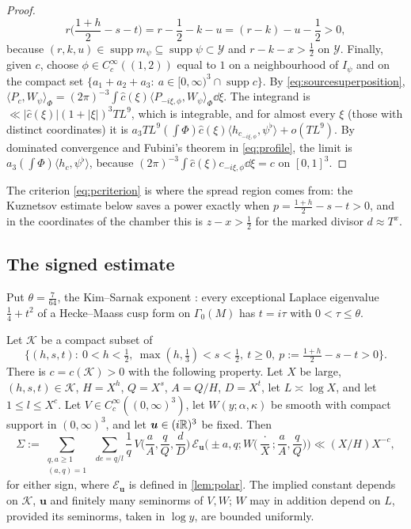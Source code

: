 \documentclass[11pt,colorlinks]{charlie}
\newcommand{\ip}[2]{\langle #1,#2\rangle}
\begin{document}
\begin{proof}
\begin{equation}\label{eq:pcriterion}
 r\Big(\frac{1+h}2-s-t\Big)=r-\frac12-k-u=(r-k)-u-\frac12>0,
\end{equation}
because $(r,k,u)\in\operatorname{supp}m_\psi\subseteq\operatorname{supp}\psi\subset\mathcal Y$ and $r-k-x>\frac12$ on $\mathcal Y$. Finally, given $c$, choose $\phi\in C_c^\infty((1,2))$ equal to $1$ on a neighbourhood of $I_\psi$ and on the compact set $\{a_1+a_2+a_3:\ a\in[0,\infty)^3\cap\operatorname{supp}c\}$. By \eqref{eq:sourcesuperposition}, $\ip{P_c}{W_\psi}_\Phi=(2\pi)^{-3}\int\widehat c(\xi)\ip{P_{-i\xi,\phi}}{W_\psi}_\Phi\dd\xi$. The integrand is $\ll|\widehat c(\xi)|(1+|\xi|)^3TL^9$, which is integrable, and for almost every $\xi$ (those with distinct coordinates) it is $a_3TL^9(\int\Phi)\widehat c(\xi)\ip{h_{c_{-i\xi,\phi}}}{\psi^\flat}+o(TL^9)$. By dominated convergence and Fubini's theorem in \eqref{eq:profile}, the limit is $a_3(\int\Phi)\ip{h_c}{\psi^\flat}$, because $(2\pi)^{-3}\int\widehat c(\xi)c_{-i\xi,\phi}\dd\xi=c$ on $[0,1]^3$.
\end{proof}

\begin{remark}
The criterion \eqref{eq:pcriterion} is where the spread region comes from: the Kuznetsov estimate below saves a power exactly when $p=\frac{1+h}2-s-t>0$, and in the coordinates of the chamber this is $z-x>\frac12$ for the marked divisor $d\approx T^x$.
\end{remark}

\subsection{The signed estimate}
Put $\theta=\frac7{64}$, the Kim--Sarnak exponent \cite{KimSarnak}: every exceptional Laplace eigenvalue $\frac14+t^2$ of a Hecke--Maass cusp form on $\Gamma_0(M)$ has $t=i\tau$ with $0<\tau\le\theta$.

\begin{theorem}\label{thm:signed}
Let $\mathcal K$ be a compact subset of
\[
 \Big\{(h,s,t):\ 0<h<\tfrac12,\ \max(h,\tfrac13)<s<\tfrac12,\ t\ge0,\ p:=\tfrac{1+h}2-s-t>0\Big\}.
\]
There is $c=c(\mathcal K)>0$ with the following property. Let $X$ be large, $(h,s,t)\in\mathcal K$, $H=X^h$, $Q=X^s$, $A=Q/H$, $D=X^t$, let $L\asymp\log X$, and let $1\le l\le X^{c}$. Let $V\in C_c^\infty((0,\infty)^3)$, let $W(y;\alpha,\kappa)$ be smooth with compact support in $(0,\infty)^3$, and let $\boldsymbol u\in(i\mathbb{R})^3$ be fixed. Then
\[
 \Sigma:=\sum_{\substack{q,a\ge1\\(a,q)=1}}\ \sum_{de=q/l}\frac1q\,V\Big(\frac aA,\frac qQ,\frac dD\Big)\,\mathcal E_{\boldsymbol u}\Big(\pm a,q;W\Big(\frac\cdot X;\frac aA,\frac qQ\Big)\Big)\ll(X/H)X^{-c},
\]
for either sign, where $\mathcal E_{\boldsymbol u}$ is defined in \cref{lem:polar}. The implied constant depends on $\mathcal K$, $\boldsymbol u$ and finitely many seminorms of $V,W$; $W$ may in addition depend on $L$, provided its seminorms, taken in $\log y$, are bounded uniformly.
\end{theorem}
\end{document}
